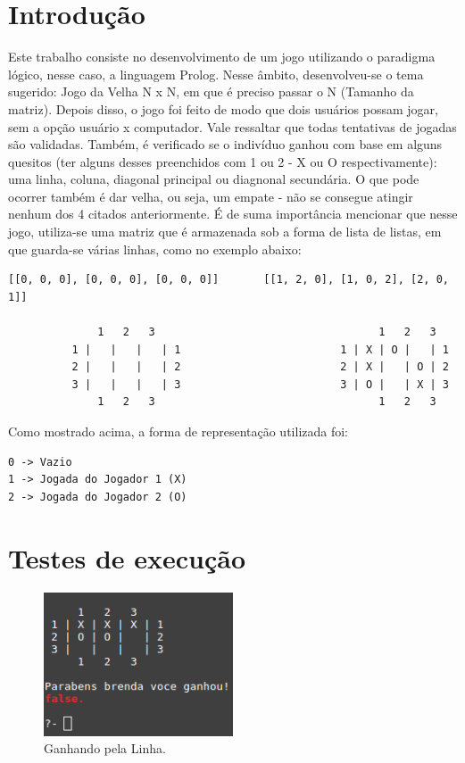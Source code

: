 \documentclass[brazil, a4paper,12pt]{article}
\begin{document}


\section{Introdução}
Este trabalho consiste no desenvolvimento de um jogo utilizando o paradigma lógico, nesse caso, a linguagem Prolog. Nesse âmbito, desenvolveu-se o tema sugerido: Jogo da Velha N x N, em que é preciso passar o N (Tamanho da matriz). Depois disso, o jogo foi feito de modo que dois usuários possam jogar, sem a opção usuário x computador. Vale ressaltar que todas tentativas de jogadas são validadas. Também, é verificado se o indivíduo ganhou com base em alguns quesitos (ter alguns desses preenchidos com 1 ou 2 - X ou O respectivamente): uma linha, coluna, diagonal principal ou diagnonal secundária. O que pode ocorrer também é dar velha, ou seja, um empate - não se consegue atingir nenhum dos 4 citados anteriormente. É de suma importância mencionar que nesse jogo, utiliza-se uma matriz que é armazenada sob a forma de lista de listas, em que guarda-se várias linhas, como no exemplo abaixo:

\begin{lstlisting}
[[0, 0, 0], [0, 0, 0], [0, 0, 0]]	    [[1, 2, 0], [1, 0, 2], [2, 0, 1]]

              1   2   3			                          1   2   3
          1 |   |   |   | 1		                    1 | X | O |   | 1
          2 |   |   |   | 2		                    2 | X |   | O | 2
          3 |   |   |   | 3		                    3 | O |   | X | 3
              1   2   3			                          1   2   3
\end{lstlisting}

Como mostrado acima, a forma de representação utilizada foi:
\begin{lstlisting}
0 -> Vazio
1 -> Jogada do Jogador 1 (X)
2 -> Jogada do Jogador 2 (O)
\end{lstlisting}

\newpage
\section{Testes de execução}

\begin{figure}[!h]
\centering
\includegraphics[width=0.5\textwidth]{img/LINHA.png}
\caption{\label{fig:fig1}Ganhando pela Linha.}
\end{figure}
\end{document}

